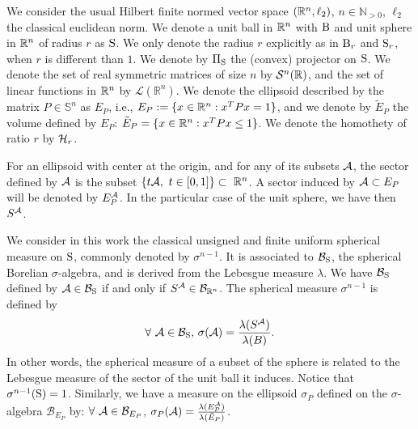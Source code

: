 We consider the usual Hilbert finite normed vector space $(\mathbb{R}^n,\ell_2)$, $n \in \mathbb{N}_{> 0}$, $\ell_2$ the classical euclidean norm. We denote a unit ball in $\mathbb{R}^n$ with $\text{B}$ and unit sphere in $\mathbb{R}^n$ of radius $r$ as $\text{S}$. We only denote the radius $r$ explicitly as in $\text{B}_r$ and $\text{S}_r$, when $r$ is different than $1$. We denote by $\Pi_{\text{S}}$ the (convex) projector on $\text{S}$. We denote the set of real symmetric matrices of size $n$ by $\mathcal{S}^n(\mathbb{R})$, and the set of linear functions in $\mathbb{R}^n$ by $\mathcal{L}(\mathbb{R}^n)$. We denote the ellipsoid described by the matrix $P \in \mathbb{S}^n$ as $E_P$, i.e., $E_P:= \{x \in \mathbb{R}^n: x^TPx = 1\}$, and we denote by $\tilde{E}_P$ the volume defined by $E_P$: $\tilde{E}_P = \{x \in \mathbb{R}^n: x^TPx \leq 1\}$. We denote the homothety of ratio $r$ by $\mathcal{H}_{r}$. 


For an ellipsoid with center at the origin, and for any of its subsets $\mathcal{A}$, the sector defined by $\mathcal{A}$ is the subset $\{t \mathcal{A}, \ t \in [0,1]\} \subset\ \mathbb{R}^n$. A sector induced by $\mathcal{A} \subset E_P$ will be denoted by $E_P^{\mathcal{A}}$. In the particular case of the unit sphere, we have then $S^{\mathcal{A}}$.

We consider in this work the classical unsigned and finite uniform spherical measure on $\text{S}$, commonly denoted by $\sigma^{n-1}$. It is associated to $\mathcal{B}_{\text{S}}$, the spherical Borelian $\sigma$-algebra, and is derived from the Lebesgue measure $\lambda$. We have $\mathcal{B}_{\text{S}}$ defined by $\mathcal{A} \in \mathcal{B}_{\text{S}}$ if and only if $S^{\mathcal{A}} \in \mathcal{B}_{\mathbb{R}^n}$. The spherical measure $\sigma^{n-1}$ is defined by
$$\forall\ \mathcal{A} \in \mathcal{B}_{\text{S}},\, \sigma(\mathcal{A}) = \frac{\lambda(S^{\mathcal{A}})}{\lambda(B)}. $$
In other words, the spherical measure of a subset of the sphere is related to the Lebesgue measure of the sector of the unit ball it induces. Notice that $\sigma^{n-1}(\text{S}) = 1$.
Similarly, we have a measure on the ellipsoid $\sigma_P$ defined on the $\sigma$-algebra $\mathcal{B}_{E_P}$ by: $\forall\ \mathcal{A} \in \mathcal{B}_{E_P}$, $\sigma_P(\mathcal{A}) = \frac{\lambda(E_P^{\mathcal{A}})}{\lambda(\tilde{E}_P)}$.
